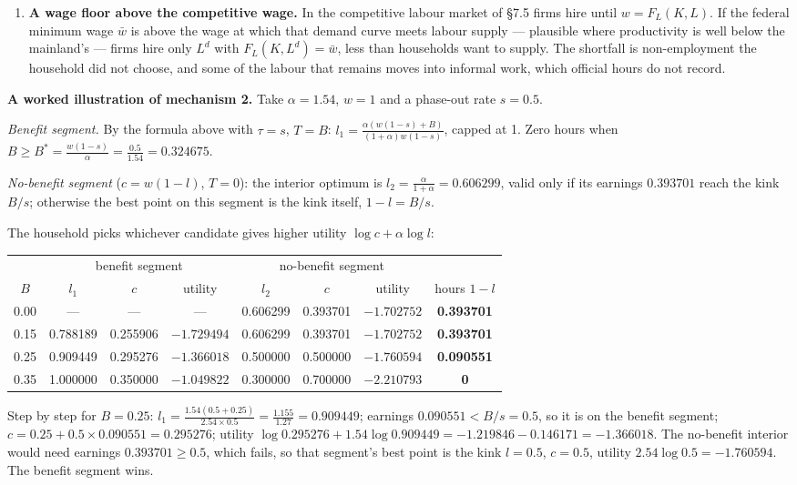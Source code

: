 \documentclass[12pt, letterpaper]{article}
\begin{document}
\begin{tcolorbox}[evenbox,title={Problem 7.4 \quad Puerto Rico}]
\begin{enumerate}
\item \textbf{A wage floor above the competitive wage.} In the competitive labour market of
\S7.5 firms hire until $w=F_L(K,L)$. If the federal minimum wage $\bar w$ is above the wage at
which that demand curve meets labour supply --- plausible where productivity is well below the
mainland's --- firms hire only $L^d$ with $F_L(K,L^d)=\bar w$, less than households want to
supply. The shortfall is non-employment the household did not choose, and some of the labour
that remains moves into informal work, which official hours do not record.
\end{enumerate}

\textbf{A worked illustration of mechanism 2.} Take $\alpha=1.54$, $w=1$ and a phase-out rate
$s=0.5$.

\emph{Benefit segment.} By the formula above with $\tau=s$, $T=B$:
$l_1=\frac{\alpha(w(1-s)+B)}{(1+\alpha)w(1-s)}$, capped at 1. Zero hours when
$B\ge B^*=\frac{w(1-s)}{\alpha}=\frac{0.5}{1.54}=0.324675$.

\emph{No-benefit segment} ($c=w(1-l)$, $T=0$): the interior optimum is
$l_2=\frac{\alpha}{1+\alpha}=0.606299$, valid only if its earnings $0.393701$ reach the kink
$B/s$; otherwise the best point on this segment is the kink itself, $1-l=B/s$.

The household picks whichever candidate gives higher utility $\log c+\alpha\log l$:

\begin{center}
\small
\begin{tabular}{@{}c|ccc|ccc|c@{}}
\toprule
 & \multicolumn{3}{c|}{benefit segment} & \multicolumn{3}{c|}{no-benefit segment} & \\
$B$ & $l_1$ & $c$ & utility & $l_2$ & $c$ & utility & hours $1-l$\\
\midrule
0.00 & --- & --- & --- & 0.606299 & 0.393701 & $-1.702752$ & \textbf{0.393701}\\
0.15 & 0.788189 & 0.255906 & $-1.729494$ & 0.606299 & 0.393701 & $\mathbf{-1.702752}$ & \textbf{0.393701}\\
0.25 & 0.909449 & 0.295276 & $\mathbf{-1.366018}$ & 0.500000 & 0.500000 & $-1.760594$ & \textbf{0.090551}\\
0.35 & 1.000000 & 0.350000 & $\mathbf{-1.049822}$ & 0.300000 & 0.700000 & $-2.210793$ & \textbf{0}\\
\bottomrule
\end{tabular}
\end{center}

Step by step for $B=0.25$: $l_1=\frac{1.54(0.5+0.25)}{2.54\times0.5}=\frac{1.155}{1.27}
=0.909449$; earnings $0.090551<B/s=0.5$, so it is on the benefit segment; $c=0.25+0.5\times
0.090551=0.295276$; utility $\log0.295276+1.54\log0.909449=-1.219846-0.146171=-1.366018$.
The no-benefit interior would need earnings $0.393701\ge0.5$, which fails, so that segment's
best point is the kink $l=0.5$, $c=0.5$, utility $2.54\log0.5=-1.760594$. The benefit
segment wins.


\end{tcolorbox}
\end{document}
